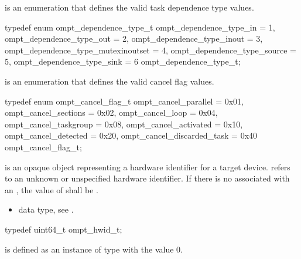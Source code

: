 
\label{sec:ompt_dependence_type_t}
 is an enumeration that defines the valid task dependence 
type values.


\begin{ccppspecific}
\begin{omptEnum}
typedef enum ompt_dependence_type_t {
  ompt_dependence_type_in              = 1,
  ompt_dependence_type_out             = 2,
  ompt_dependence_type_inout           = 3,
  ompt_dependence_type_mutexinoutset   = 4,
  ompt_dependence_type_source          = 5,
  ompt_dependence_type_sink            = 6
} ompt_dependence_type_t;
\end{omptEnum}
\end{ccppspecific}






\label{sec:ompt_cancel_flag_t}
 is an enumeration that defines the valid cancel flag values.


\begin{ccppspecific}
\begin{omptEnum}
typedef enum ompt_cancel_flag_t {
  ompt_cancel_parallel       = 0x01,
  ompt_cancel_sections       = 0x02,
  ompt_cancel_loop           = 0x04,
  ompt_cancel_taskgroup      = 0x08,
  ompt_cancel_activated      = 0x10,
  ompt_cancel_detected       = 0x20,
  ompt_cancel_discarded_task = 0x40
} ompt_cancel_flag_t;
\end{omptEnum}
\end{ccppspecific}



\label{sec:ompt_hwid_t}
 is an opaque object representing a hardware identifier for a target device.
\label{sec:ompt_hwid_none}
 refers to an unknown or unspecified hardware identifier.
If there is no  associated with an
, the value of  shall be
.

\crossreferences
\begin{itemize}
\item {} data type, see .
\end{itemize}


\begin{ccppspecific}
\begin{omptOther}
typedef uint64_t ompt_hwid_t;
\end{omptOther}
\end{ccppspecific}

 is defined as an instance of type  with the value 
0.



